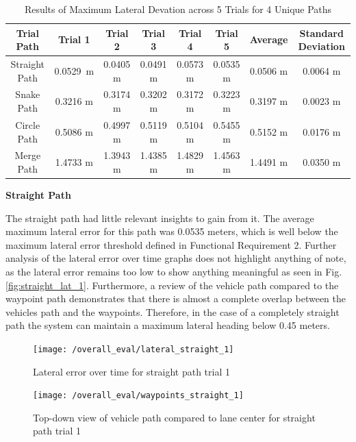 \documentclass[titlepage,draft]{article}
\begin{document}
{\begin{table}[H]
	\centering
	\begin{tabular}{c c c c c c c c }
		\textbf{Trial Path} & \textbf{Trial 1} & \textbf{Trial 2} & \textbf{Trial 3} & \textbf{Trial 4} & \textbf{Trial 5} & \textbf{Average} & \textbf{Standard Deviation} \\ [0.5ex]
		\hline
		Straight Path & 0.0529 m & 0.0405 m & 0.0491 m & 0.0573 m & 0.0535 m & 0.0506 m & 0.0064 m \\		
		\hline
		Snake Path & 0.3216 m & 0.3174 m & 0.3202 m & 0.3172 m & 0.3223 m & 0.3197 m & 0.0023 m \\		
		\hline
		Circle Path & 0.5086 m & 0.4997 m & 0.5119 m & 0.5104 m & 0.5455 m & 0.5152 m & 0.0176 m \\		
		\hline
		Merge Path & 1.4733 m & 1.3943 m & 1.4385 m & 1.4829 m & 1.4563 m & 1.4491 m & 0.0350 m \\		
		\hline
	\end{tabular}
	\caption{Results of Maximum Lateral Devation across 5 Trials for 4 Unique Paths}
	\label{tab:overal_eval}
\end{table}

\textbf{Straight Path}

The straight path had little relevant insights to gain from it. The average maximum lateral error for this path was 0.0535 meters, which is well below the maximum lateral error threshold defined in Functional Requirement 2. Further analysis of the lateral error over time graphs does not highlight anything of note, as the lateral error remains too low to show anything meaningful as seen in Fig. \ref{fig:straight_lat_1}. Furthermore, a review of the vehicle path compared to the waypoint path demonstrates that there is almost a complete overlap between the vehicles path and the waypoints. Therefore, in the case of a completely straight path the system can maintain a maximum lateral heading below 0.45 meters.

\begin{figure}
	\centering
	\begin{minipage}{.45\textwidth}
		\centering
		\texttt{[image: /overall\_eval/lateral\_straight\_1]}
		\caption{Lateral error over time for straight path trial 1}
		\label{fig:straight_lat_1}
	\end{minipage}%
	\hspace{0.1\textwidth}%
	\begin{minipage}{.45\textwidth}
		\centering
		\texttt{[image: /overall\_eval/waypoints\_straight\_1]}
		\caption{Top-down view of vehicle path compared to lane center for straight path trial 1}
		\label{fig:straight_way_1}
	\end{minipage}
\end{figure}

}
\end{document}
